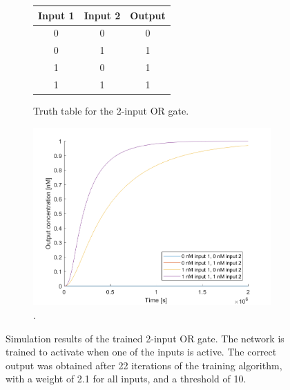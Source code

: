 \begin{figure}[H]
  \begin{subfigure}[t]{.49\columnwidth}
    \begin{tabular}[b]{ccc}
      \hline
    \multicolumn{1}{l}{\textbf{Input 1}} & \multicolumn{1}{l}{\textbf{Input 2}} & \multicolumn{1}{l}{\textbf{Output}} \\
    \hline
    0                                    & 0                                    & 0                                   \\
    0                                    & 1                                    & 1                                   \\
    1                                    & 0                                    & 1                                   \\
    1                                    & 1                                    & 1 \\
    \hline
    \end{tabular}
    \caption{Truth table for the 2-input OR gate.}
    \label{and_table}
\end{subfigure}
\hfill
\begin{subfigure}[t]{.49\columnwidth}
  \centering
\includegraphics[width=\linewidth]{images/or_simulation.png}
\caption{.}
\label{}
\end{subfigure}
\caption{Simulation results of the trained 2-input OR gate. The network is trained to activate when one of the inputs is active. The correct output was obtained after 22 iterations of the training algorithm, with a weight of 2.1 for all inputs, and a threshold of 10.}
\end{figure}

